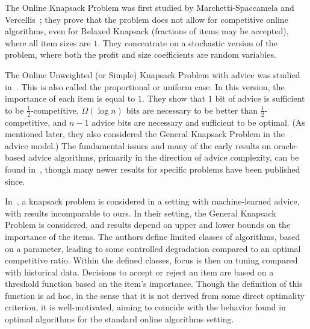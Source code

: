 \documentclass[a4paper,UKenglish,cleveref, autoref, thm-restate]{lipics-v2021}
\begin{document}
The Online Knapsack Problem was first studied by Marchetti-Spaccamela
and Vercellis~\cite{M-SV95}; they prove that the problem does not
allow for competitive online algorithms, even for Relaxed Knapsack
(fractions of items may be accepted), where all item sizes are $1$.
They concentrate on a stochastic version of the problem, where both
the profit and size coefficients are random variables.

The Online Unweighted (or Simple) Knapsack Problem with advice was
studied in~\cite{BKKR14}.
This is also called the proportional or
uniform case. In this version, the importance of each item is
equal to $1$.  They show that $1$ bit of advice is sufficient to
be $\frac12$-competitive, $\Omega(\log n)$ bits are necessary to be
better than $\frac12$-competitive, and $n-1$ advice bits are necessary
and sufficient to be optimal.
 (As mentioned later, they also considered the General
Knapsack Problem in the advice model.) The fundamental issues and  many of the early
results on oracle-based advice algorithms, primarily in the direction
of advice complexity, can be found in~\cite{BFKLM17}, though many
newer results for specific problems have been published since.

In~\cite{ZSHW20}, a knapsack problem is considered in a setting with
machine-learned advice, with results incomparable to ours. In their
setting, the General Knapsack Problem is considered, and results depend on upper
and lower bounds on the importance of the items.
The authors define
limited classes of algorithms, based on a parameter, leading to some
controlled degradation compared to an optimal competitive
ratio. Within the defined classes, focus is then on tuning compared
with historical data. Decisions to accept or reject an item are based
on a threshold function based on the item's importance.
Though the
definition of this function is ad hoc, in the sense that it is not
derived from some direct optimality criterion, it is well-motivated,
aiming to coincide with the behavior found in optimal algorithms for
the standard online algorithms setting.
\end{document}
